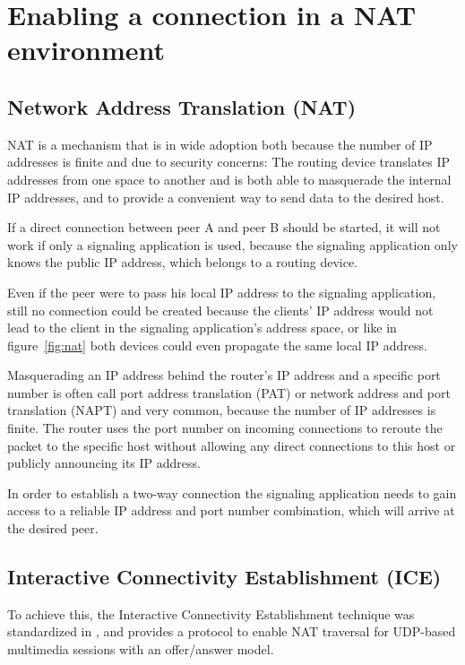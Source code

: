 \documentclass[../../../thesis.tex]{subfiles}
\begin{document}
\clearpage
\section{Enabling a connection in a NAT environment}
\label{sec:ice}

\subsection{Network Address Translation (NAT)}
NAT is a mechanism that is in wide adoption both because the number of IP addresses is finite and due to security concerns: The routing device translates IP addresses from one space to another and is both able to masquerade the internal IP addresses, and to provide a convenient way to send data to the desired host.\\



If a direct connection between peer A and peer B should be started, it will not work if only a signaling application is used, because the signaling application only knows the public IP address, which belongs to a routing device.\par
Even if the peer were to pass his local IP address to the signaling application, still no connection could be created because the clients' IP address would not lead to the client in the signaling application's address space, or like in figure~\ref{fig:nat} both devices could even propagate the same local IP address.


Masquerading an IP address behind the router's IP address and a specific port number is often call port address translation (PAT) or network address and port translation (NAPT) and very common, because the number of IP addresses is finite.
The router uses the port number on incoming connections to reroute the packet to the specific host without allowing any direct connections to this host or publicly announcing its IP address.\cite{Doyle.2001}
\par
{}
In order to establish a two-way connection the signaling application needs to gain access to a reliable IP address and port number combination, which will arrive at the desired peer.


\subsection{Interactive Connectivity Establishment (ICE)}
To achieve this, the Interactive Connectivity Establishment technique was standardized in , and provides a protocol to enable NAT traversal for UDP-based multimedia sessions with an offer/answer model.\\
\end{document}
